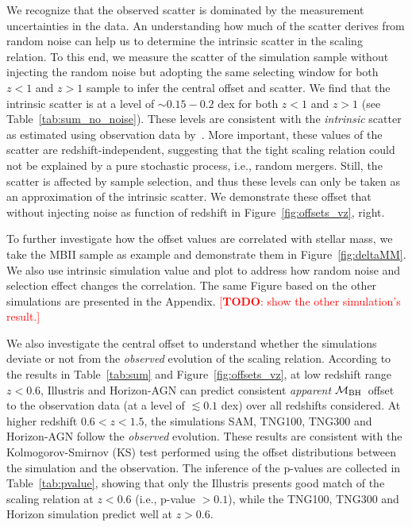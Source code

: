 \documentclass[twocolumn]{aastex631}
\newcommand{\todo}[1]{\textcolor{red}{[{\bf TODO}: #1]}}
\def\smass{{$M_*$}}
\def\mbh{$\mathcal M_{\rm BH}$}
\begin{document}
We recognize that the observed scatter is dominated by the measurement uncertainties in the data. An understanding how much of the scatter derives from random noise can help us to determine the intrinsic scatter in the scaling relation. To this end, we measure the scatter of the simulation sample without injecting the random noise but adopting the same selecting window for both $z<1$ and $z>1$ sample to infer the central offset and scatter. We find that the intrinsic scatter is at a level of $\sim0.15-0.2$ dex for both $z<1$ and $z>1$ (see Table~\ref{tab:sum_no_noise}). These levels are consistent with the {\it intrinsic} scatter as estimated using observation data by~\citet{Ding2020, 2021arXiv210902751L}. More important, these values of the scatter are redshift-independent, suggesting that the tight scaling relation could not be explained by a pure stochastic process, i.e., random mergers. Still, the scatter is affected by sample selection, and thus these levels can only be taken as an approximation of the intrinsic scatter. We demonstrate these offset that without injecting noise as function of redshift in Figure~\ref{fig:offsets_vz}, right.

To further investigate how the offset values are correlated with stellar mass, we take the MBII sample as example and demonstrate them in Figure~\ref{fig:deltaMM}. We also use intrinsic simulation value and plot to address how random noise and selection effect changes the correlation. The same Figure based on the other simulations are presented in the Appendix. \todo{show the other simulation's result.}

We also investigate the central offset to understand whether the simulations deviate or not from the {\it observed} evolution of the scaling relation. According to the results in Table~\ref{tab:sum} and Figure~\ref{fig:offsets_vz}, at low redshift range $z<0.6$, Illustris and Horizon-AGN can predict consistent {\it apparent} \mbh\ offset to the observation data (at a level of $\lesssim0.1$ dex) over all redshifts considered. At higher redshift $0.6<z<1.5$, the simulations SAM, TNG100, TNG300 and Horizon-AGN follow the {\it observed} evolution. These results are consistent with the Kolmogorov-Smirnov (KS) test performed using the offset distributions between the simulation and the observation. The inference of the p-values are collected in Table~\ref{tab:pvalue}, showing that only the Illustris presents good match of the scaling relation at $z<0.6$ (i.e., p-value $> 0.1$), while the TNG100, TNG300 and Horizon simulation predict well at $z>0.6$. 
\end{document}
